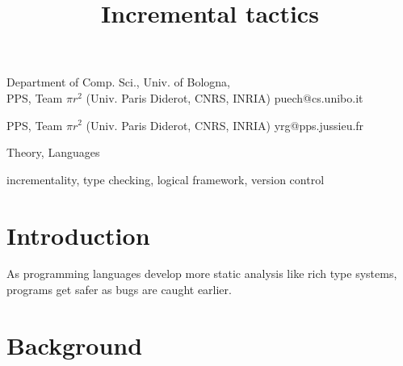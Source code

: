 \documentclass[9pt]{sigplanconf}
\begin{document}
\copyrightdata{[to be supplied]}


\title{Incremental tactics}

           {Department of Comp. Sci., Univ. of Bologna,\\
             PPS, Team $\pi r^2$ (Univ. Paris Diderot, CNRS, INRIA)}
           {puech@cs.unibo.it}

           {PPS, Team $\pi r^2$ (Univ. Paris Diderot, CNRS, INRIA)}
           {yrg@pps.jussieu.fr}

\maketitle

\begin{abstract}
\end{abstract}

 

\terms
Theory, Languages

\keywords
incrementality, type checking, logical framework, version control


\section*{Introduction}

As programming languages develop more static analysis like rich type
systems, programs get safer as bugs are caught earlier.


\section{Background}
\end{document}
